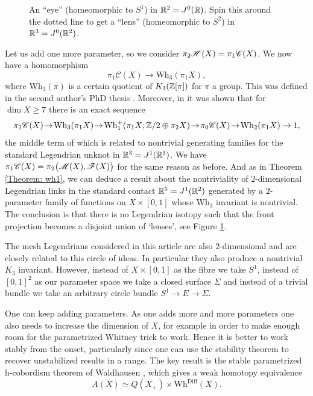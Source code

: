 \documentclass[11pt]{article}
\newcommand{\smaller}{\small}
\numberwithin{equation}{section}\providecommand{\dpl}{\displaystyle}
\let\mathcal\mathscr
\newcommand{\Diff}{\mathrm{Diff}}
\newcommand{\Wh}{\mathrm{Wh}}
\theoremstyle{plain}
\theoremstyle{definition}
\newcommand{\cC}{\mathcal{C}}\newcommand{\cD}{\mathcal{D}}
\newcommand{\cM}{\mathcal{M}}\newcommand{\cN}{\mathcal{N}}
\begin{document}
\begin{figure}[htbp]
\begin{center}
\caption{\smaller An ``eye'' (homeomorphic to $S^1$) in $\mathbb{R}^2=J^0(\mathbb{R})$. Spin this around the dotted line to get a ``lens'' (homeomorphic to $S^2$) in $\mathbb{R}^3=J^0(\mathbb{R}^2)$. }
\label{Fig: eye}
\end{center}
\end{figure}
%

Let us add one more parameter, so we consider $\pi_2 \cH(X) = \pi_1 \cC(X)$. We now have a homomorphism
\[ \pi_1\cC(X) \to \Wh_3( \pi_1X ), \]
where $\Wh_3(\pi)$ is a certain quotient of $K_3(\mathbb{Z}[\pi])$ for $\pi$ a group. This was defined in the second author's PhD thesis \cite{I79}. Moreover, in \cite{I82} it was shown that for $\dim X \geq 7$ there is an exact sequence
\[ \pi_1 \cC(X) \!\to\! \Wh_3(\pi_1 X) \!\to\! \Wh^+_1(\pi_1X ; \bZ/2 \oplus \pi_2 X) \!\to\! \pi_0 \cC(X) \!\to\! \Wh_2(\pi_1 X) \rightarrow 1, \]
the middle term of which is related to nontrivial generating families for the standard Legendrian unknot in $\mathbb{R}^3=J^1(\mathbb{R}^1)$. We have $ \pi_1\cC(X) = \pi_2\big( \cM(X), \cF(X) \big)$ for the same reason as before. And as in Theorem \ref{Theorem: wh1}, we can deduce a result about the nontriviality of $2$-dimensional Legendrian links in the standard contact $\mathbb{R}^5=J^1(\mathbb{R}^2)$ generated by a $2$-parameter family of functions on $X \times [0,1]$ whose $\Wh_3$ invariant is nontrivial. The conclusion is that there is no Legendrian isotopy such that the front projection becomes a disjoint union of `lenses', see Figure \ref{Fig: eye}.

The mesh Legendrians considered in this article are also $2$-dimensional and are closely related to this circle of ideas. In particular they also produce a nontrivial $K_3$ invariant. However, instead of $X \times [0,1]$ as the fibre we take $S^1$, instead of $[0,1]^2$ as our parameter space we take a closed surface $\Sigma$ and instead of a trivial bundle we take an arbitrary circle bundle $S^1 \to E \to \Sigma$.

One can keep adding parameters. As one adds more and more parameters one also needs to increase the dimension of $X$, for example in order to make enough room for the parametrized Whitney trick to work. Hence it is better to work stably from the onset, particularly since one can use the stability theorem \cite{I88} to recover unstabilized results in a range. The key result is the stable parametrized h-cobordism theorem of Waldhausen \cite{W82}, which gives a weak homotopy equivalence
\[ A(X) \simeq Q(X_+) \times \Wh^{\Diff}(X). \]
\end{document}
